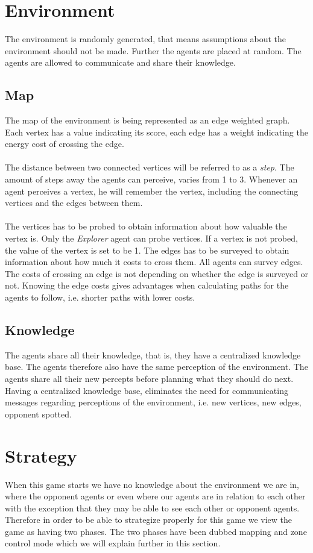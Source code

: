 \documentclass[11pt]{article}
\begin{document}
\section{Environment}
The environment is randomly generated, that means assumptions about the environment should not be made. Further the agents are placed at random. The agents are allowed to communicate and share their knowledge.

\subsection{Map}
The map of the environment is being represented as an edge weighted graph. Each vertex has a value indicating its score, each edge has a weight indicating the energy cost of crossing the edge.\\
\\
The distance between two connected vertices will be referred to as a \emph{step}. The amount of steps away the agents can perceive, varies from 1 to 3. Whenever an agent perceives a vertex, he will remember the vertex, including the connecting vertices and the edges between them.\\
\\
The vertices has to be probed to obtain information about how valuable the vertex is. Only the \emph{Explorer} agent can probe vertices. If a vertex is not probed, the value of the vertex is set to be 1. The edges has to be surveyed to obtain information about how much it costs to cross them. All agents can survey edges. The costs of crossing an edge is not depending on whether the edge is surveyed or not. Knowing the edge costs gives advantages when calculating paths for the agents to follow, i.e. shorter paths with lower costs.

\subsection{Knowledge}
The agents share all their knowledge, that is, they have a centralized knowledge base. The agents therefore also have the same perception of the environment. The agents share all their new percepts before planning what they should do next. Having a centralized knowledge base, eliminates the need for communicating messages regarding perceptions of the environment, i.e. new vertices, new edges, opponent spotted.

\section{Strategy}
When this game starts we have no knowledge about the environment we are in, where the opponent agents or even where our agents are in relation to each other with the exception that they may be able to see each other or opponent agents. Therefore in order to be able to strategize properly for this game we view the game as having two phases. The two phases have been dubbed mapping and zone control mode which we will explain further in this section.
\end{document}
